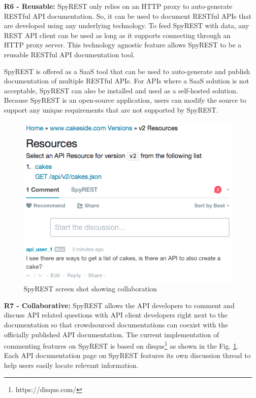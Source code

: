 \documentclass[conference]{IEEEtran}
\begin{document}
\textbf{R6 - Reusable:} SpyREST only relies on an HTTP proxy to auto-generate RESTful API documentation. So, it can be used to document RESTful APIs that are developed using any underlying technology. To feed SpyREST with data, any REST API client can be used as long as it supports connecting through an HTTP proxy server. This technology agnostic feature allows SpyREST to be a reusable RESTful API documentation tool.

SpyREST is offered as a SaaS tool that can be used to auto-generate and publish documentation of multiple RESTful APIs. For APIs where a SaaS solution is not acceptable, SpyREST can also be installed and used as a self-hosted solution. Because SpyREST is an open-source application, users can modify the source to support any unique requirements that are not supported by SpyREST.

\begin{figure}[!tbh]
  \centering
  \includegraphics[width=\linewidth]{comments.png}
  \caption{SpyREST screen shot showing collaboration}
  \label{fig:comments}
\end{figure}


\textbf{R7 - Collaborative:} SpyREST allows the API developers to comment and discuss API related questions with API client developers right next to the documentation so that crowdsourced documentations can coexist with the officially published API documentation. The current implementation of commenting features on SpyREST is based on disqus\footnote{https://disqus.com/} as shown in the Fig. \ref{fig:comments}. Each API documentation page on SpyREST features its own discussion thread to help users easily locate relevant information.
\end{document}
